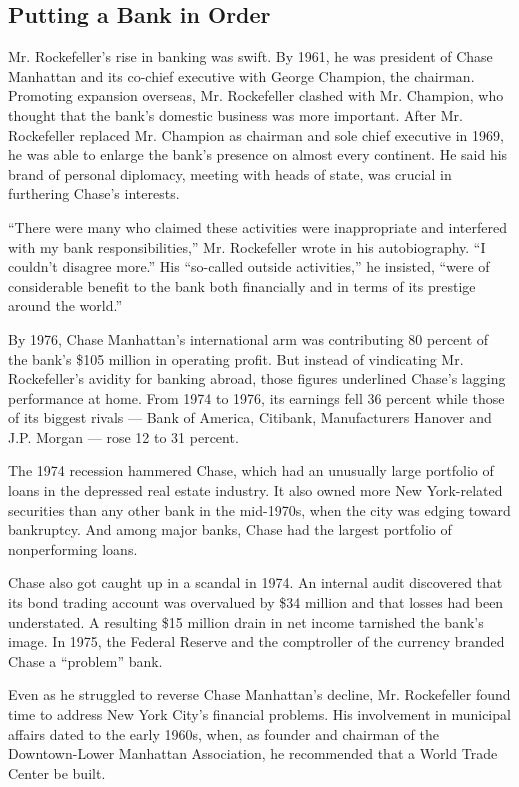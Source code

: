 \hypertarget{putting-a-bank-in-order}{%
\subsection{Putting a Bank in Order}\label{putting-a-bank-in-order}}

Mr. Rockefeller's rise in banking was swift. By 1961, he was president
of Chase Manhattan and its co-chief executive with George Champion, the
chairman. Promoting expansion overseas, Mr. Rockefeller clashed with Mr.
Champion, who thought that the bank's domestic business was more
important. After Mr. Rockefeller replaced Mr. Champion as chairman and
sole chief executive in 1969, he was able to enlarge the bank's presence
on almost every continent. He said his brand of personal diplomacy,
meeting with heads of state, was crucial in furthering Chase's
interests.

``There were many who claimed these activities were inappropriate and
interfered with my bank responsibilities,'' Mr. Rockefeller wrote in his
autobiography. ``I couldn't disagree more.'' His ``so-called outside
activities,'' he insisted, ``were of considerable benefit to the bank
both financially and in terms of its prestige around the world.''

By 1976, Chase Manhattan's international arm was contributing 80 percent
of the bank's \$105 million in operating profit. But instead of
vindicating Mr. Rockefeller's avidity for banking abroad, those figures
underlined Chase's lagging performance at home. From 1974 to 1976, its
earnings fell 36 percent while those of its biggest rivals --- Bank of
America, Citibank, Manufacturers Hanover and J.P. Morgan --- rose 12 to
31 percent.

The 1974 recession hammered Chase, which had an unusually large
portfolio of loans in the depressed real estate industry. It also owned
more New York-related securities than any other bank in the mid-1970s,
when the city was edging toward bankruptcy. And among major banks, Chase
had the largest portfolio of nonperforming loans.

Chase also got caught up in a scandal in 1974. An internal audit
discovered that its bond trading account was overvalued by \$34 million
and that losses had been understated. A resulting \$15 million drain in
net income tarnished the bank's image. In 1975, the Federal Reserve and
the comptroller of the currency branded Chase a ``problem'' bank.

Even as he struggled to reverse Chase Manhattan's decline, Mr.
Rockefeller found time to address New York City's financial problems.
His involvement in municipal affairs dated to the early 1960s, when, as
founder and chairman of the Downtown-Lower Manhattan Association, he
recommended that a World Trade Center be built.

